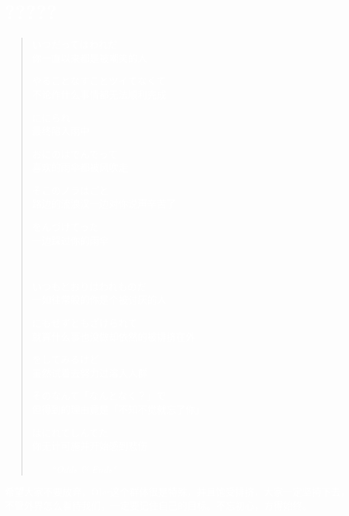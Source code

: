 \section*{\textcolor{white}{?????}}
\begin{quote}

	\textcolor{white}{いつだってはわれだ\\
		你一直以来都是被嘲笑的人}

	\textcolor{white}{やることなすことツイてなくて\\
		不论作什么事情都无法顺利完成}

	\textcolor{white}{ににられ\\
		最终陷入雨中}

	\textcolor{white}{おにのはでんでって\\
		喜欢的雨伞都被风吹走}

	\textcolor{white}{そこのノラはごと\\
		路边的流浪汉一边对你说声辛苦了}

	\textcolor{white}{をんづけてった\\
		一边踩过你的雨伞}

	\ \par

	\textcolor{white}{いつもどおりはわれものだ\\
		一如往常般的你是个被讨厌的人}

	\textcolor{white}{にもせずともざけられて\\
		就算什么事也没做却依然的被排挤在外}

	\textcolor{white}{をしてみるけど\\
		虽然试着去努力过溶入人群}

	\textcolor{white}{そのなんて「なんとなく？」で\\
		但得到的理由竟是「不知不觉就忘了你」}

	\textcolor{white}{はにれてしんでた\\
		你无计可施并开始感到悲伤}
	\begin{flushright}\textcolor{white}{------}\em{\textcolor{white}{``Odds \& Ends"}}\end{flushright}
\end{quote}

\textcolor{white}{希望大家不要放弃，OIer这个群体很是特殊，并且饱受排挤，大家一定坚持下去，不管外界怎么看待我们，一定要记住自己的目标。不忘初心，方得始终。}
\newpage